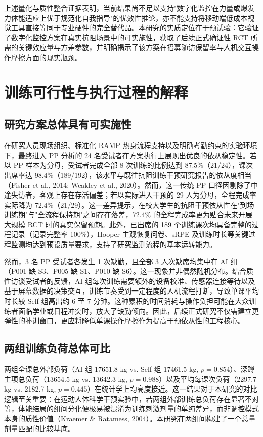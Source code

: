 \documentclass[UTF8,zihao=-4,twoside,openany]{ctexbook}
\begin{document}
上述量化与质性整合证据表明，当前结果尚不足以支持"数字化监控在力量或爆发力体能适应上优于规范化自我指导"的优效性推论，亦不能支持将移动端低成本视觉工具直接等同于专业硬件的完全替代品。本研究的实质定位在于预试验：它验证了数字化监控方案在真实抗阻场景中的可实施性，获取了后续正式确证性 RCT 所需的关键效应量与方差参数，并明确揭示了该方案在招募随访保留率与人机交互操作摩擦方面的现实瓶颈。

\section{训练可行性与执行过程的解释}

\subsection{研究方案总体具有可实施性}
在研究人员现场组织、标准化 RAMP 热身流程支持以及明确考勤约束的实验环境下，最终进入 PP 分析的 24 名受试者在方案执行上展现出优良的依从稳定性。若以 PP 样本为分母，受试者完成全部 8 次训练的比例达到 87.5\%（21/24），课次出席率达 98.4\%（189/192），该水平与既往抗阻训练干预研究报告的依从度相当（Fisher et al., 2014; Weakley et al., 2020）。然而，这一传统 PP 口径因剔除了中途失访者，客观上存在存活偏差；若以实际进入干预的 29 人为分母，全程完成率实际降为 72.4\%（21/29）。这一差异提示，在校大学生的抗阻干预依从性在"到场训练期"与"全流程保持期"之间存在落差，72.4\% 的全程完成率更为贴合未来开展大规模 RCT 时的真实保留预期。此外，已出席的 189 个训练课次均具备完整的过程记录（记录完整率 100\%），Hooper 主观恢复问卷、sRPE 及训练时长等关键过程监测均达到预设质量要求，支持了研究监测流程的基本运转能力。

然而，3 名 PP 受试者各发生 1 次缺勤，且全部 3 人次缺席均集中在 AI 组（P001 缺 S3、P005 缺 S1、P010 缺 S6）。这一现象并非偶然随机分布。结合质性访谈受试者的反馈，AI 组每次训练需要额外的设备校准、传感器连接等待以及基于屏幕数据的决策交互，训练节奏受到一定程度的人机流程打断，导致单课平均时长较 Self 组高出约 6 至 7 分钟。这种累积的时间消耗与操作负担可能在大众训练者面临学业或日程冲突时，放大了缺勤倾向。因此，后续正式研究不仅需建立更弹性的补训窗口，更应将降低单课操作摩擦作为提高干预依从性的工程核心。

\subsection{两组训练负荷总体可比}
两组全课总外部负荷（AI 组 17651.8 kg vs. Self 组 17461.5 kg, $p=0.854$）、深蹲主项总负荷（13654.5 kg vs. 13642.3 kg, $p=0.988$）以及平均每课次负荷（2297.7 kg vs. 2182.7 kg, $p=0.445$）在统计学上均高度接近。这一结果对于本研究的对比逻辑至关重要：在运动人体科学干预实验中，若两组外部训练总负荷存在显著不对等，体能结局的组间分化便极易被混淆为训练刺激剂量的单纯差异，而非调控模式本身的质性价值（Kraemer \& Ratamess, 2004）。本研究在两组间构建了一个总量剂量匹配的比较基底。
\end{document}
